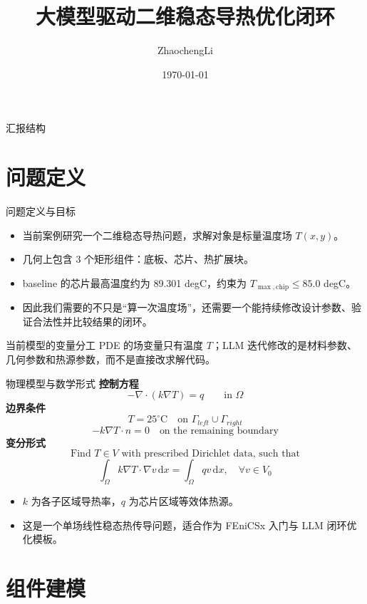 \documentclass[aspectratio=169]{ctexbeamer}
\title{大模型驱动二维稳态导热优化闭环}
\author{ZhaochengLi}
\institute{中科院微小卫星创新院}
\date{\today}
\begin{document}
\begin{frame}
\titlepage
\end{frame}

\begin{frame}{汇报结构}
\tableofcontents
\end{frame}

\section{问题定义}

\begin{frame}{问题定义与目标}
\begin{itemize}
\item 当前案例研究一个二维稳态导热问题，求解对象是标量温度场 $T(x,y)$。
\item 几何上包含 3 个矩形组件：底板、芯片、热扩展块。
\item baseline 的芯片最高温度约为 89.301 degC，约束为 $T_{\max,\mathrm{chip}} \le 85.0$ degC。
\item 因此我们需要的不只是“算一次温度场”，还需要一个能持续修改设计参数、验证合法性并比较结果的闭环。
\end{itemize}
\vspace{0.3cm}
\begin{block}{当前模型的变量分工}
PDE 的场变量只有温度 $T$；LLM 迭代修改的是材料参数、几何参数和热源参数，而不是直接改求解代码。
\end{block}
\end{frame}

\begin{frame}{物理模型与数学形式}
\small
\textbf{控制方程}
\[
-\nabla \cdot \left(k \nabla T \right) = q \qquad \text{in } \Omega
\]
\textbf{边界条件}
\[
T = 25^\circ \mathrm{C} \quad \text{on } \Gamma_{left} \cup \Gamma_{right}
\]
\[
-k \nabla T \cdot n = 0 \quad \text{on the remaining boundary}
\]
\textbf{变分形式}
\[
\text{Find } T \in V \text{ with prescribed Dirichlet data, such that}
\]
\[
\int_{\Omega} k \nabla T \cdot \nabla v \, \mathrm{d}x
=
\int_{\Omega} q v \, \mathrm{d}x,
\quad \forall v \in V_0
\]
\begin{itemize}
\item $k$ 为各子区域导热率，$q$ 为芯片区域等效体热源。
\item 这是一个单场线性稳态热传导问题，适合作为 FEniCSx 入门与 LLM 闭环优化模板。
\end{itemize}
\end{frame}

\section{组件建模}
\end{document}

